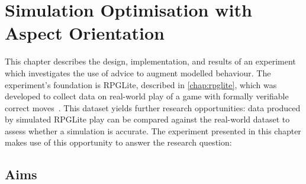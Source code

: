 \chapter{Simulation Optimisation with Aspect Orientation}\label{chap:exp1_simulation_optimisation}


This chapter describes the design, implementation, and results of an experiment
which investigates the use of advice to augment modelled behaviour. The
experiment's foundation is RPGLite, described in \cref{chap:rpglite}, which was
developed to collect data on real-world play of a game with formally verifiable
correct moves~\cite{rpglite_dataset}. This dataset yields further research opportunities: data produced
by simulated RPGLite play can be compared against the real-world dataset to
assess whether a simulation is accurate. The experiment presented in this
chapter makes use of this opportunity to answer the research question:




\section{Aims}\label{sec:aop_simulation_optimisation_aims}

